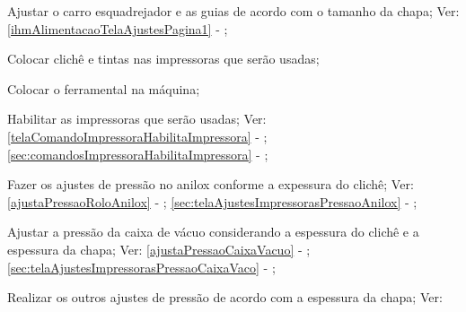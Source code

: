 \begin{procedureAdjustmentNoRecipe}
  \item[\ding{\dingNumber}] Ajustar o carro esquadrejador e as guias de acordo com o tamanho da chapa; Ver: \ref{ihmAlimentacaoTelaAjustesPagina1} - ;
  \item[\ding{\dingNumber}] Colocar clichê e tintas nas impressoras que serão usadas;
  \item[\ding{\dingNumber}] Colocar o ferramental na máquina;
  \item[\ding{\dingNumber}] Habilitar as impressoras que serão usadas; Ver: 
  \ifmachineType
  \ref{telaComandoImpressoraHabilitaImpressora} - ;
  \else
  \ref{sec:comandosImpressoraHabilitaImpressora} - ;
  \fi
  \item[\ding{\dingNumber}] Fazer os ajustes de pressão no anilox conforme a expessura do clichê; Ver: 
  \ifmachineType
  \ref{ajustaPressaoRoloAnilox} - ;
  \else
  \ref{sec:telaAjustesImpressorasPressaoAnilox} - ;
  \fi
  \item[\ding{\dingNumber}] Ajustar a pressão da caixa de vácuo considerando a espessura do clichê e a espessura da chapa; Ver: 
  \ifmachineType
  \ref{ajustaPressaoCaixaVacuo} - ;
  \else
  \ref{sec:telaAjustesImpressorasPressaoCaixaVaco} - ;
  \fi
  \item[\ding{\dingNumber}] Realizar os outros ajustes de pressão de acordo com a espessura da chapa; Ver: 

    \begin{pressureAdjustment}
      \ifmachineType


\end{pressureAdjustment}
\end{procedureAdjustmentNoRecipe}
